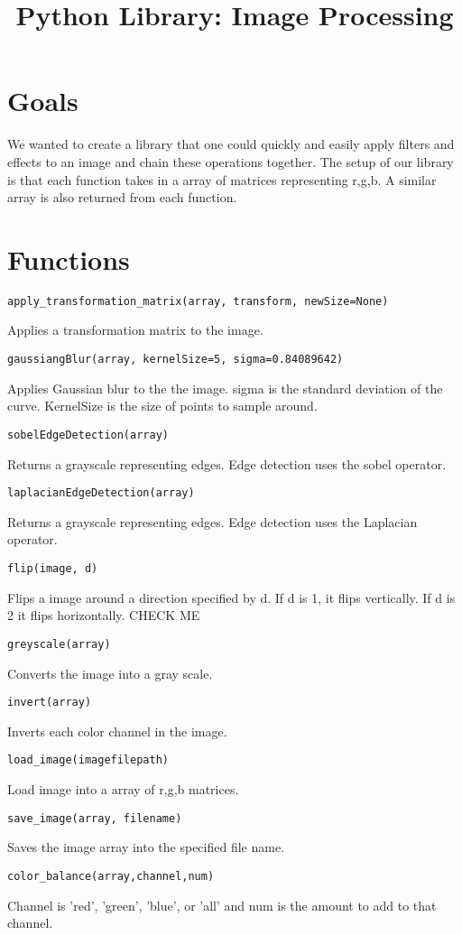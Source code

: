 \documentclass[11pt]{article}
\title{\textbf{Python Library: Image Processing}}
\author{}
\date{}
\begin{document}
\maketitle

\section{Goals}
We wanted to create a library that one could quickly and easily apply filters and effects to an image and chain these operations together. The setup of our library is that each function takes in a array of matrices representing r,g,b. A similar array is also returned from each function.

\section{Functions}
\begin{verbatim}
apply_transformation_matrix(array, transform, newSize=None)
\end{verbatim}
Applies a transformation matrix to the image.
\begin{verbatim}
gaussiangBlur(array, kernelSize=5, sigma=0.84089642)
\end{verbatim}
Applies Gaussian blur to the the image. sigma is the standard deviation of the curve. KernelSize is the size of points to sample around.
\begin{verbatim}
sobelEdgeDetection(array)
\end{verbatim}
Returns a grayscale representing edges. Edge detection uses the sobel operator.

\begin{verbatim}
laplacianEdgeDetection(array)
\end{verbatim}
Returns a grayscale representing edges. Edge detection uses the Laplacian operator.

\begin{verbatim}
flip(image, d)
\end{verbatim}
Flips a image around a direction specified by d. If d is 1, it flips vertically. If d is 2 it flips horizontally.
CHECK ME

\begin{verbatim}
greyscale(array)
\end{verbatim}
Converts the image into a gray scale. 
\begin{verbatim}
invert(array)
\end{verbatim}
Inverts each color channel in the image. 

\begin{verbatim}
load_image(imagefilepath)
\end{verbatim}

Load image into a array of r,g,b matrices. 

\begin{verbatim}
save_image(array, filename)
\end{verbatim}

Saves the image array into the specified file name.

\begin{verbatim}
color_balance(array,channel,num)
\end{verbatim}
Channel is 'red', 'green', 'blue', or 'all' and num is the amount to add to that channel.
\end{document}

